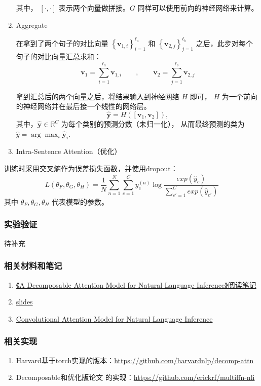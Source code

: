 \begin{enumerate}
        其中， $[\cdot, \cdot]$ 表示两个向量做拼接。$G$ 同样可以使用前向的神经网络来计算。

    \item Aggregate

        在拿到了两个句子的对比向量 $\left\{\mathbf{v}_{1,i}\right\}_{i=1}^{\ell_a}$ 和
        $\left\{\mathbf{v}_{2,j}\right\}_{j=1}^{\ell_b}$ 之后，此步对每个句子的对比向量汇总求和：
        \[
            \mathbf{v}_{1}=\sum_{i=1}^{\ell_a} \mathbf{v}_{1,i} \qquad,\qquad 
            \mathbf{v}_{2}=\sum_{j=1}^{\ell_b} \mathbf{v}_{2,j}
        \]

        拿到汇总后的两个向量之后，将结果输入到神经网络 $H$ 即可，
        $H$ 为一个前向的神经网络并在最后接一个线性的网络层。
        \[
            \hat{\mathbf{y}} = H([\mathbf{v}_1, \mathbf{v}_2]),
        \]
        其中，$\hat{\mathbf{y}} \in \mathbb{R}^{C}$ 为每个类别的预测分数（未归一化），
        从而最终预测的类为 $\hat{y} = \arg\max_{i}{\hat{\mathbf{y}}_i}$.

    \item Intra-Sentence Attention（优化）

\end{enumerate}


训练时采用交叉熵作为误差损失函数，并使用dropout：
\[
    L(\theta_F, \theta_G, \theta_H) = \frac{1}{N}\sum_{n=1}^{N}\sum_{c=1}^{C}
                                    {y_c^{(n)} \log \frac{exp(\hat{y}_c)}{\sum_{c'=1}^{C}{exp(\hat{y}_{c'})}}}
\]
其中 $\theta_F, \theta_G, \theta_H$ 代表模型的参数。


\subsubsection{实验验证}
待补充


\subsubsection{相关材料和笔记}
\begin{enumerate}
    \item \href{https://zhuanlan.zhihu.com/p/26237357}{《A Decomposable Attention Model for Natural Language Inference》阅读笔记}
    \item \href{https://pdfs.semanticscholar.org/2c3a/1947e2635d6be3da8a3cf06f137847a1cc02.pdf}{slides}
    \item \href{https://towardsdatascience.com/convolutional-attention-model-for-natural-language-inference-a754834c0d83}{
                    Convolutional Attention Model for Natural Language Inference}
\end{enumerate}


\subsubsection{相关实现}
\begin{enumerate}
    \item Harvard基于torch实现的版本：\url{https://github.com/harvardnlp/decomp-attn}

    \item Decomposable和优化版论文 \cite{chen2017enhanced} 的实现：\url{https://github.com/erickrf/multiffn-nli}

\end{enumerate}

\ifx\papersnotes\undefined
    
\fi
